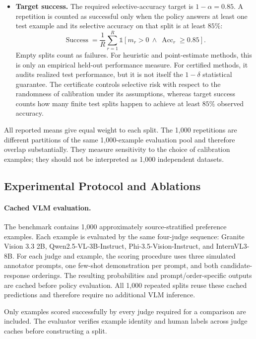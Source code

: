 \documentclass[11pt]{article}
\begin{document}
\begin{itemize}
    \item \textbf{Target success.}
    The required selective-accuracy target is
    $1-\alpha=0.85$. A repetition is counted as successful only when the
    policy answers at least one test example and its selective accuracy on
    that split is at least $85\%$:
    \[
        \operatorname{Success} =
        \frac{1}{R}
        \sum_{r=1}^{R}
        \mathbb{1}
        \left[
            m_r>0
            \ \land\
            \operatorname{Acc}_r\geq 0.85
        \right].
    \]
    Empty splits count as failures. For heuristic and point-estimate methods,
    this is only an empirical held-out performance measure. For certified
    methods, it audits realized test performance, but it is not itself the
    $1-\delta$ statistical guarantee. The certificate controls selective risk
    with respect to the randomness of calibration under its assumptions,
    whereas target success counts how many finite test splits happen to
    achieve at least $85\%$ observed accuracy.
\end{itemize}

All reported means give equal weight to each split. The 1,000 repetitions are
different partitions of the same 1,000-example evaluation pool and therefore
overlap substantially. They measure sensitivity to the choice of calibration
examples; they should not be interpreted as 1,000 independent datasets.

\subsection{Experimental Protocol and Ablations}

\paragraph{Cached VLM evaluation.}
The benchmark contains 1,000 approximately source-stratified preference
examples. Each example is evaluated by the same four-judge sequence:
Granite Vision 3.3 2B, Qwen2.5-VL-3B-Instruct,
Phi-3.5-Vision-Instruct, and InternVL3-8B. For each judge and example, the
scoring procedure uses three simulated annotator prompts, one few-shot
demonstration per prompt, and both candidate-response orderings. The resulting
probabilities and prompt/order-specific outputs are cached before policy
evaluation. All 1,000 repeated splits reuse these cached predictions and
therefore require no additional VLM inference.

Only examples scored successfully by every judge required for a comparison are
included. The evaluator verifies example identity and human labels across judge
caches before constructing a split.
\end{document}
